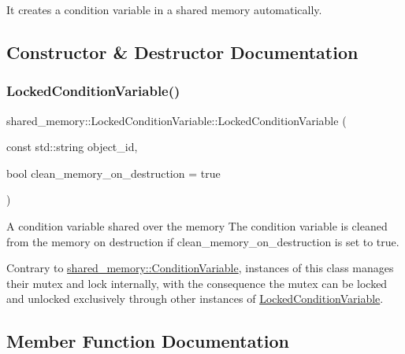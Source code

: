 It creates a condition variable in a shared memory automatically. 

\subsection{Constructor \& Destructor Documentation}
\mbox{\label{classshared__memory_1_1LockedConditionVariable_a648057022bbf8a7b5221e1170b1e099c}} 
\subsubsection{\texorpdfstring{Locked\+Condition\+Variable()}{LockedConditionVariable()}}
{\footnotesize\ttfamily shared\+\_\+memory\+::\+Locked\+Condition\+Variable\+::\+Locked\+Condition\+Variable (\begin{DoxyParamCaption}\item[{const std\+::string}]{object\+\_\+id,  }\item[{bool}]{clean\+\_\+memory\+\_\+on\+\_\+destruction = {\ttfamily true} }\end{DoxyParamCaption})}



A condition variable shared over the memory The condition variable is cleaned from the memory on destruction if clean\+\_\+memory\+\_\+on\+\_\+destruction is set to true. 

Contrary to \hyperlink{classshared__memory_1_1ConditionVariable}{shared\+\_\+memory\+::\+Condition\+Variable}, instances of this class manages their mutex and lock internally, with the consequence the mutex can be locked and unlocked exclusively through other instances of \hyperlink{classshared__memory_1_1LockedConditionVariable}{Locked\+Condition\+Variable}. 

\subsection{Member Function Documentation}
\mbox{\label{classshared__memory_1_1LockedConditionVariable_aa3bca5020f84c8e0a90a2dad3e6521e5}} 
